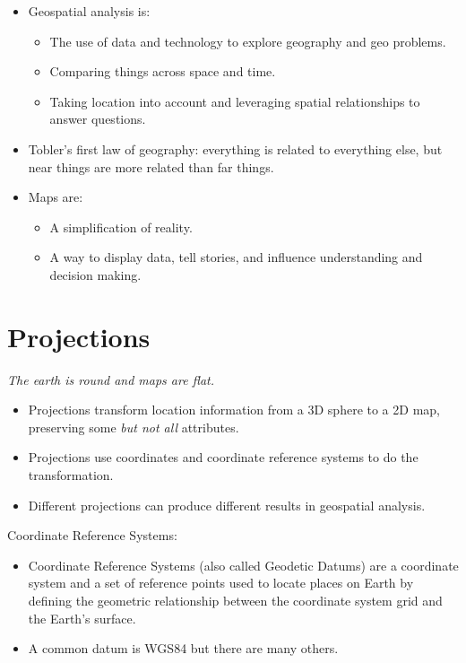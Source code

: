 \documentclass[oneside]{memoir}
\providecommand{\tightlist}{%
  \setlength{\itemsep}{0pt}\setlength{\parskip}{0pt}}
\theoremstyle{definition}
\theoremstyle{definition}
\theoremstyle{definition}
\theoremstyle{remark}
\begin{document}
\begin{itemize}
\item
  Geospatial analysis is:

  \begin{itemize}
  \tightlist
  \item
    The use of data and technology to explore geography and geo
    problems.
  \item
    Comparing things across space and time.\\
  \item
    Taking location into account and leveraging spatial relationships to
    answer questions.
  \end{itemize}
\item
  Tobler's first law of geography: everything is related to everything
  else, but near things are more related than far things.
\item
  Maps are:

  \begin{itemize}
  \tightlist
  \item
    A simplification of reality.
  \item
    A way to display data, tell stories, and influence understanding and
    decision making.
  \end{itemize}
\end{itemize}

\section{Projections}\label{projections}

\emph{The earth is round and maps are flat.}

\begin{itemize}
\item
  Projections transform location information from a 3D sphere to a 2D
  map, preserving some \emph{but not all} attributes.
\item
  Projections use coordinates and coordinate reference systems to do the
  transformation.
\item
  Different projections can produce different results in geospatial
  analysis.
\end{itemize}

Coordinate Reference Systems:

\begin{itemize}
\item
  Coordinate Reference Systems (also called Geodetic Datums) are a
  coordinate system and a set of reference points used to locate places
  on Earth by defining the geometric relationship between the coordinate
  system grid and the Earth's surface.
\item
  A common datum is WGS84 but there are many others.
\end{itemize}
\end{document}
